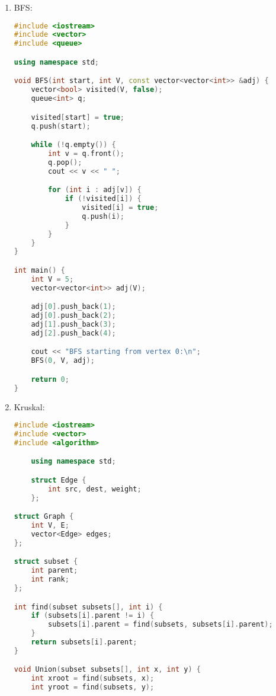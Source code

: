 \begin{enumerate}
\begin{lstlisting}[language=C++]
int main() {
    int V = 5;
    vector<vector<int>> adj(V);

    adj[0].push_back(1);
    adj[0].push_back(2);
    adj[1].push_back(3);
    adj[2].push_back(4);

    cout << "DFS starting from vertex 0:\n";
    DFS(V, adj);

    return 0;
}

	\end{lstlisting}
\item BFS:
	\begin{lstlisting}[language=C++]
	#include <iostream>
#include <vector>
#include <queue>

using namespace std;

void BFS(int start, int V, const vector<vector<int>> &adj) {
    vector<bool> visited(V, false);
    queue<int> q;

    visited[start] = true;
    q.push(start);

    while (!q.empty()) {
        int v = q.front();
        q.pop();
        cout << v << " ";

        for (int i : adj[v]) {
            if (!visited[i]) {
                visited[i] = true;
                q.push(i);
            }
        }
    }
}

int main() {
    int V = 5;
    vector<vector<int>> adj(V);

    adj[0].push_back(1);
    adj[0].push_back(2);
    adj[1].push_back(3);
    adj[2].push_back(4);

    cout << "BFS starting from vertex 0:\n";
    BFS(0, V, adj);

    return 0;
}

	\end{lstlisting}
	\item Kruskal:
	\begin{lstlisting}[language=C++]
#include <iostream>
#include <vector>
#include <algorithm>

	using namespace std;

	struct Edge {
		int src, dest, weight;
	};

struct Graph {
	int V, E;
	vector<Edge> edges;
};

struct subset {
	int parent;
	int rank;
};

int find(subset subsets[], int i) {
	if (subsets[i].parent != i) {
		subsets[i].parent = find(subsets, subsets[i].parent);
	}
	return subsets[i].parent;
}

void Union(subset subsets[], int x, int y) {
	int xroot = find(subsets, x);
	int yroot = find(subsets, y);


\end{lstlisting}
\end{enumerate}

